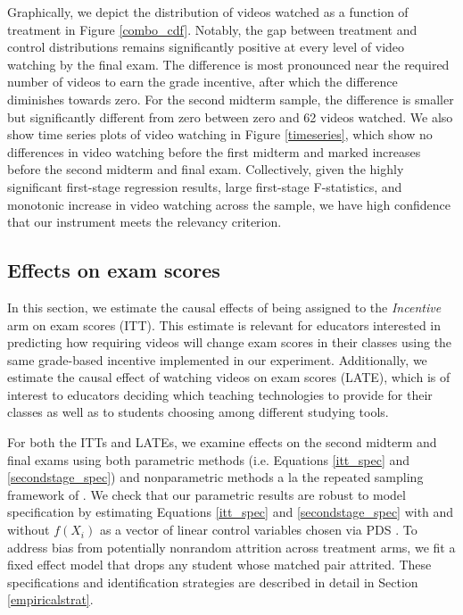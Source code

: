 \documentclass[12pt]{article}
\begin{document}
Graphically, we depict the distribution of videos watched as a function of treatment in Figure \ref{combo_cdf}. Notably, the gap between treatment and control distributions remains significantly positive at every level of video watching by the final exam. The difference is most pronounced near the required number of videos to earn the grade incentive, after which the difference diminishes towards zero. For the second midterm sample, the difference is smaller but significantly different from zero between zero and 62 videos watched. We also show time series plots of video watching in Figure \ref{timeseries}, which show no differences in video watching before the first midterm and marked increases before the second midterm and final exam. Collectively, given the highly significant first-stage regression results, large first-stage F-statistics, and monotonic increase in video watching across the sample, we have high confidence that our instrument meets the relevancy criterion.

\subsection{Effects on exam scores}

In this section, we estimate the causal effects of being assigned to the \textit{Incentive} arm on exam scores (ITT). This estimate is relevant for educators interested in predicting how requiring videos will change exam scores in their classes using the same grade-based incentive implemented in our experiment. Additionally, we estimate the causal effect of watching videos on exam scores (LATE), which is of interest to educators deciding which teaching technologies to provide for their classes as well as to students choosing among different studying tools.

For both the ITTs and LATEs, we examine effects on the second midterm and final exams using both parametric methods (i.e. Equations \ref{itt_spec} and \ref{secondstage_spec}) and nonparametric methods a la the repeated sampling framework of \textcite{neyman1923}. We check that our parametric results are robust to model specification by estimating Equations \ref{itt_spec} and \ref{secondstage_spec} with and without $f(X_i)$ as a vector of linear control variables chosen via PDS \parencite{bch2014a}. To address bias from potentially nonrandom attrition across treatment arms, we fit a fixed effect model that drops any student whose matched pair attrited. These specifications and identification strategies are described in detail in Section \ref{empiricalstrat}.
\end{document}
